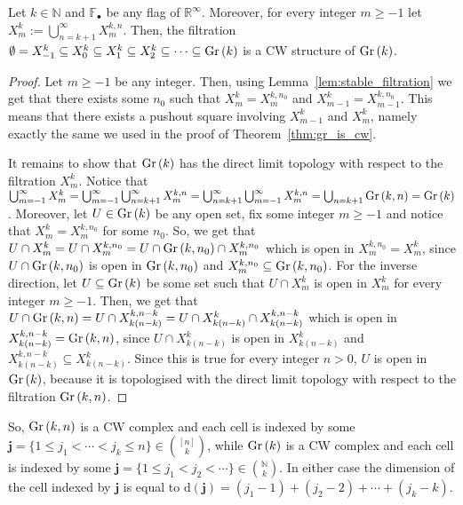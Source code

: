 \begin{theorem} Let $k\in\mathbb{N}$ and $\mathbb{F}_{\bullet}$ be any flag of $\mathbb{R}^{\infty}$. Moreover, for every integer $m\geq-1$ let $X_m^k:=\bigcup_{n=k+1}^{\infty}X_m^{k,n}$. Then, the filtration
$\emptyset=X_{-1}^k\subseteq X_0^k\subseteq X_1^k\subseteq X_2^k\subseteq\cdots\subseteq\Gr{k}$
is a CW structure of $\Gr{k}$.
\end{theorem}
\begin{proof} Let $m\geq-1$ be any integer. Then, using Lemma~\ref{lem:stable_filtration} we get that there exists some $n_0$ such that $X_m^k=X_m^{k,n_0}$ and $X_{m-1}^k=X_{m-1}^{k,n_0}$. This means that there exists a pushout square involving $X_{m-1}^k$ and $X_m^k$, namely exactly the same we used in the proof of Theorem~\ref{thm:gr_is_cw}.

It remains to show that $\Gr{k}$ has the direct limit topology with respect to the filtration $X_m^k$. Notice that $\bigcup_{m=-1}^{\infty}X_m^k=\bigcup_{m=-1}^{\infty}\bigcup_{n=k+1}^{\infty}X_m^{k,n}=\bigcup_{n=k+1}^{\infty}\bigcup_{m=-1}^{\infty}X_m^{k,n}=\bigcup_{n=k+1}\Gr{k}{n}=\Gr{k}$. Moreover, let $U\in\Gr{k}$ be any open set, fix some integer $m\geq-1$ and notice that $X_m^k=X_m^{k,n_0}$ for some $n_0$. So, we get that $U\cap X_m^k=U\cap X_m^{k,n_0}=U\cap\Gr{k}{n_0}\cap X_m^{k,n_0}$ which is open in $X_m^{k,n_0}=X_m^k$, since $U\cap\Gr{k}{n_0}$ is open in $\Gr{k}{n_0}$ and $X_m^{k,n_0}\subseteq\Gr{k}{n_0}$. For the inverse direction, let $U\subseteq\Gr{k}$ be some set such that $U\cap X_m^k$ is open in $X_m^k$ for every integer $m\geq-1$. Then, we get that $U\cap\Gr{k}{n}=U\cap X_{k(n-k)}^{k,n-k}=U\cap X_{k(n-k)}^k\cap X_{k(n-k)}^{k,n-k}$ which is open in $X_{k(n-k)}^{k,n-k}=\Gr{k}{n}$, since $U\cap X_{k(n-k)}^k$ is open in $X_{k(n-k)}^k$ and $X_{k(n-k)}^{k,n-k}\subseteq X_{k(n-k)}^k$. Since this is true for every integer $n>0$, $U$ is open in $\Gr{k}$, because it is topologised with the direct limit topology with respect to the filtration $\Gr{k}{n}$.
\end{proof}

So, $\Gr{k}{n}$ is a CW complex and each cell is indexed by some $\mathbf{j}=\{1\leq j_1<\cdots<j_k\leq n\}\in\binom{[n]}{k}$, while $\Gr{k}$ is a CW complex and each cell is indexed by some $\mathbf{j}=\{1\leq j_1<j_2<\cdots\}\in\binom{\mathbb{N}}{k}$. In either case the dimension of the cell indexed by $\mathbf{j}$ is equal to $\mathrm{d}(\mathbf{j})=(j_1-1)+(j_2-2)+\cdots+(j_k-k)$.

